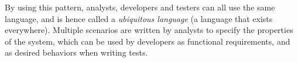 \linebreak
\linebreak

By using this pattern, analysts, developers and testers can all use the
same language, and is hence called a \emph{ubiquitous language} (a
language that exists everywhere). Multiple scenarios are written by
analysts to specify the properties of the system, which can be used by
developers as functional requirements, and as desired behaviors when
writing tests.\\
